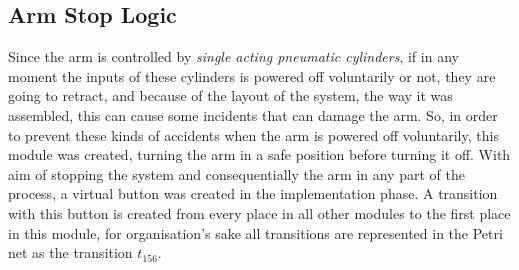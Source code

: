 \subsection{Arm Stop Logic}
Since the arm is controlled by \emph{single acting pneumatic cylinders}, if in any
moment the inputs of these cylinders is powered off voluntarily or not, they are going to retract,
and because of the layout of the system, the way it was assembled, this can
cause some incidents that can damage the arm. So, in order to prevent these
kinds of
accidents when the arm is powered off voluntarily, this module was created,
turning the arm in a safe position before turning it off. With aim of stopping
the system and consequentially the arm in any part of the process, a virtual button was created
in the implementation phase. A transition with this button is created from every
place in all other modules to the first place in this module, for organisation's
sake all transitions are represented in the Petri net as the transition $t_156$.

